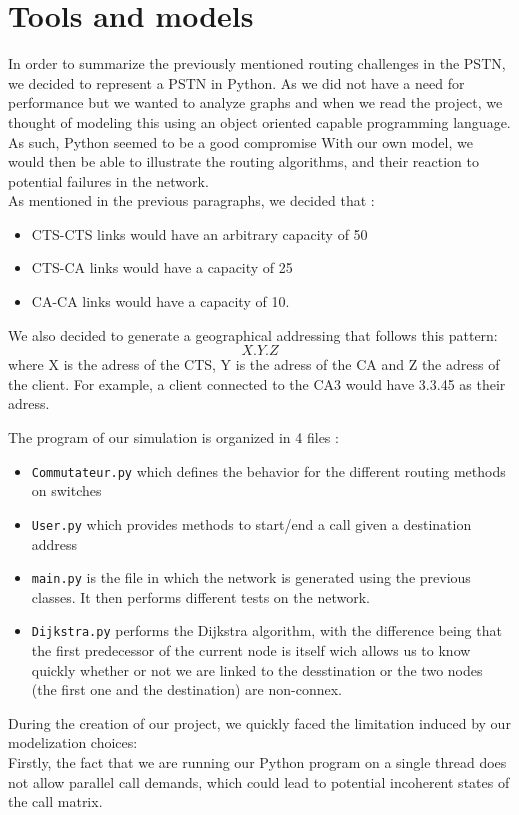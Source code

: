 \documentclass[lettersize,journal]{IEEEtran} %
\begin{document}
\section{Tools and models}
In order to summarize the previously mentioned routing challenges in the PSTN, we decided to represent a PSTN in Python.
As we did not have a need for performance but we wanted to analyze graphs and when we read the project, we thought of
modeling this using an object oriented capable programming language. As such, Python seemed to be a good compromise
With our own model, we would then be able to illustrate the routing algorithms, and their reaction to potential failures in the
network.\\
As mentioned in the previous paragraphs, we decided that :
\begin{itemize}
        \item CTS-CTS links would have an arbitrary capacity of 50
        \item CTS-CA links would have a capacity of 25
        \item CA-CA links would have a capacity of 10.
\end{itemize}
We also decided to generate a geographical addressing that follows this pattern:
\[X.Y.Z\]
where X is the adress of the CTS, Y is the adress of the CA and Z the adress of the client.
For example, a client connected to the CA3 would have 3.3.45 as their adress.

The program of our simulation is organized in 4 files : 
\begin{itemize}
        \item \verb|Commutateur.py| which defines the behavior for the different routing methods on switches
        \item \verb|User.py| which provides methods to start/end a call given a destination address
        \item \verb|main.py| is the file in which the network is generated using the previous classes. It then 
        performs different tests on the network.
        \item \verb|Dijkstra.py| performs the Dijkstra algorithm, with the difference being that the first predecessor
        of the current node is itself wich allows us to know quickly whether or not we are linked to the desstination or
        the two nodes (the first one and the destination) are non-connex. 
\end{itemize}

During the creation of our project, we quickly faced the limitation induced by our modelization choices:\\
Firstly, the fact that we are running our Python program on a single thread does not allow parallel call demands, which could lead
to potential incoherent states of the call matrix.\\
\end{document}

